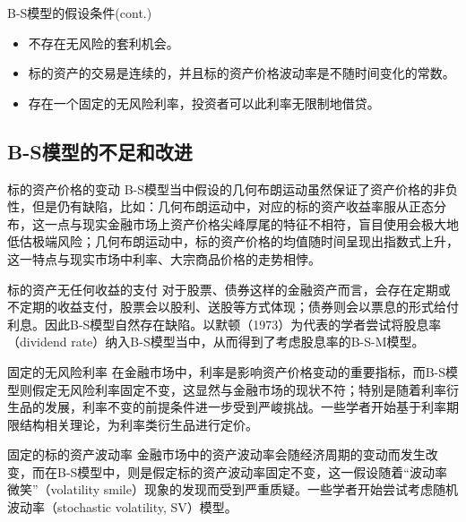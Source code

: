 \documentclass[t]{beamer}
\begin{document}
\begin{frame}{B-S模型的假设条件(cont.)}
			\begin{itemize}
		\item  不存在无风险的套利机会。
		\item 标的资产的交易是连续的，并且标的资产价格波动率是不随时间变化的常数。
		\item 存在一个固定的无风险利率，投资者可以此利率无限制地借贷。
	\end{itemize}
\end{frame}

\subsection{B-S模型的不足和改进}
\begin{frame}{标的资产价格的变动}
	B-S模型当中假设的几何布朗运动虽然保证了资产价格的非负性，但是仍有缺陷，比如：几何布朗运动中，对应的标的资产收益率服从正态分布，这一点与现实金融市场上资产价格尖峰厚尾的特征不相符，盲目使用会极大地低估极端风险；几何布朗运动中，标的资产价格的均值随时间呈现出指数式上升，这一特点与现实市场中利率、大宗商品价格的走势相悖。
\end{frame}


\begin{frame}{标的资产无任何收益的支付}
	对于股票、债券这样的金融资产而言，会存在定期或不定期的收益支付，股票会以股利、送股等方式体现；债券则会以票息的形式给付利息。因此B-S模型自然存在缺陷。以默顿（1973）为代表的学者尝试将股息率（dividend rate）纳入B-S模型当中，从而得到了考虑股息率的B-S-M模型。
\end{frame}


\begin{frame}{固定的无风险利率}
	在金融市场中，利率是影响资产价格变动的重要指标，而B-S模型则假定无风险利率固定不变，这显然与金融市场的现状不符；特别是随着利率衍生品的发展，利率不变的前提条件进一步受到严峻挑战。一些学者开始基于利率期限结构相关理论，为利率类衍生品进行定价。
\end{frame}

\begin{frame}{固定的标的资产波动率}
	金融市场中的资产波动率会随经济周期的变动而发生改变，而在B-S模型中，则是假定标的资产波动率固定不变，这一假设随着“波动率微笑”（volatility smile）现象的发现而受到严重质疑。一些学者开始尝试考虑随机波动率（stochastic volatility, SV）模型。
\end{frame}
\end{document}
